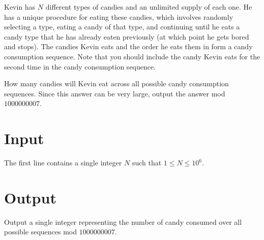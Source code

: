 
Kevin has $N$ different types of candies and an unlimited supply of each one. He has a unique procedure for
eating these candies, which involves randomly selecting a type, eating a candy of that type, and continuing
until he eats a candy type that he has already eaten previously (at which point he gets bored and stops).
The candies Kevin eats and the order he eats them in form a candy consumption sequence. Note that you should
include the candy Kevin eats for the second time in the candy consumption sequence.

How many candies will Kevin eat across all possible candy consumption sequences. Since this answer can be
very large, output the answer mod $1000000007$.

\section*{Input}
The first line contains a single integer $N$ such that $1 \leq N \leq 10^6$.

\section*{Output}
Output a single integer representing the number of candy consumed over all possible sequences mod
$1000000007$.

